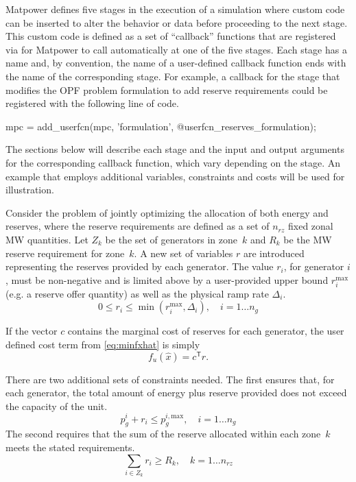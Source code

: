 \documentclass[12pt]{article}
\newcommand{\matpower}[0]{{\sc Matpower}}
\newcommand{\code}[1]{{\relsize{-0.5}{\tt{{#1}}}}}  %
\newcommand{\trans}[1]{{#1}^{\ensuremath{\mathsf{T}}}}  %
\numberwithin{equation}{section}
\numberwithin{table}{section}
\numberwithin{figure}{section}
\begin{document}
\matpower{} defines five stages in the execution of a simulation where custom code can be inserted to alter the behavior or data before proceeding to the next stage. This custom code is defined as a set of ``callback'' functions that are registered via \code{add\_userfcn} for \matpower{} to call automatically at one of the five stages. Each stage has a name and, by convention, the name of a user-defined callback function ends with the name of the corresponding stage. For example, a callback for the \code{formulation} stage that modifies the OPF problem formulation to add reserve requirements could be registered with the following line of code.
\begin{Code}
mpc = add_userfcn(mpc, 'formulation', @userfcn_reserves_formulation);
\end{Code}

The sections below will describe each stage and the input and output arguments for the corresponding callback function, which vary depending on the stage. An example that employs additional variables, constraints and costs will be used for illustration.

Consider the problem of jointly optimizing the allocation of both energy and reserves, where the reserve requirements are defined as a set of $n_{rz}$ fixed zonal MW quantities. Let $Z_k$ be the set of generators in zone~$k$ and $R_k$ be the MW reserve requirement for zone~$k$. A new set of variables $r$ are introduced representing the reserves provided by each generator. The value $r_i$, for generator $i$, must be non-negative and is limited above by a user-provided upper bound $r_i^\mathrm{max}$ (e.g. a reserve offer quantity) as well as the physical ramp rate $\Delta_i$.
\begin{equation}
0 \le r_i \le \min(r_i^\mathrm{max}, \Delta_i), \quad i = 1 \dots n_g
\label{eq:reserve_var}
\end{equation}

If the vector $c$ contains the marginal cost of reserves for each generator, the user defined cost term from \eqref{eq:minfxhat} is simply
\begin{equation}
f_u(\hat{x}) = \trans{c} r.
\label{eq:reserve_cost}
\end{equation}

There are two additional sets of constraints needed. The first ensures that, for each generator, the total amount of energy plus reserve provided does not exceed the capacity of the unit.
\begin{equation}
p_g^i + r_i \le p_g^{i,\mathrm{max}}, \quad i = 1 \dots n_g
\label{eq:Pg_plus_R}
\end{equation}
The second requires that the sum of the reserve allocated within each zone~$k$ meets the stated requirements.
\begin{equation}
\sum_{i \in Z_k} r_i \ge R_k, \quad k = 1 \dots n_{rz}
\label{eq:reserve_req}
\end{equation}
\end{document}
